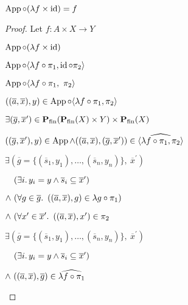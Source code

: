 \begin{prop}
  $\operatorname{App}\circ(\lambda f\times\operatorname{id}) = f$
  \begin{proof}
    Let $f : A\times X\to Y$
    \begin{itemize}
      \step
        $\operatorname{App}\circ(\lambda f\times\operatorname{id})$

      \step[=]
        $\operatorname{App}\circ\langle\lambda f\circ\pi_1,\operatorname{id}\circ\pi_2\rangle$
        \marginnote{\Def-$\times$}

      \step[=]
        $\operatorname{App}\circ\langle\lambda f\circ\pi_1,~\pi_2\rangle$
        \marginnote{\Def-$\id$}

      \step
        $((\overline{a},\overline{x}), y)\in\operatorname{App}\circ\langle\lambda f\circ\pi_1,\pi_2\rangle$

      \step[\iffs]
        $\exists(\overline{g},\overline{x}^\prime)\in\mathbf{P}_{\operatorname{fin}}(\mathbf{P}_{\operatorname{fin}}(X)\times Y)\times\mathbf{P}_{\operatorname{fin}}(X)$
        \marginnote{\Def-\ref{def:crel-comp}}

      \addtolength{\itemsep}{-.2\baselineskip}
      \step
        \quad$((\overline{g},\overline{x}^\prime), y)\in\operatorname{App}\land((\overline{a},\overline{x}),(\overline{g},\overline{x}^\prime))\in\widehat{\langle\lambda f\circ\pi_1,\pi_2\rangle}$

      \addtolength{\itemsep}{.2\baselineskip}

      \step[\iffs]
        $\exists(\overline{g} = \{(\overline{s}_1,y_1),\ldots,(\overline{s}_n,y_n)\},~\overline{x}^\prime)$

      \addtolength{\itemsep}{-.2\baselineskip}
      \step
        \quad$\phantom{\land}~(\exists i\ldotp y_i=y\land\overline{s}_i\subseteq\overline{x}^\prime)$
        \marginnote{\Def-$\App$}

      \step
        \quad$\land~(\forall g\in\overline{g}\ldotp~((\overline{a},\overline{x}),g)\in\lambda g\circ\pi_1)$

      \step
        \quad$\land~(\forall x^\prime\in\overline{x}^\prime\ldotp~((\overline{a},\overline{x}), x^\prime)\in\pi_2$
      \addtolength{\itemsep}{.2\baselineskip}

      \step[\iffs]
        $\exists(\overline{g} = \{(\overline{s}_1,y_1),\ldots,(\overline{s}_n,y_n)\},~\overline{x}^\prime)$

      \addtolength{\itemsep}{-.2\baselineskip}
      \step
        \quad$\phantom{\land}~(\exists i\ldotp y_i=y\land\overline{s}_i\subseteq\overline{x}^\prime)$

      \step
        \quad$\land~((\overline{a},\overline{x}), \overline{g})\in\widehat{\lambda f\circ\pi_1}$
        \marginnote{\Def-$~\widehat{\cdot}$}


\end{itemize}
\end{proof}
\end{prop}

